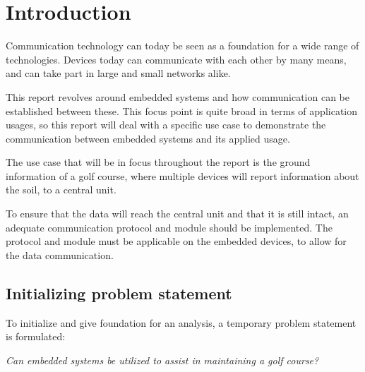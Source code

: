 \chapter{Introduction} 
Communication technology can today be seen as a foundation for a wide range of technologies. Devices today can communicate with each other by many means, and can take part in large and small networks alike.

This report revolves around embedded systems and how communication can be established between these. This focus point is quite broad in terms of application usages, so this report will deal with a specific use case to demonstrate the communication between embedded systems and its applied usage.

The use case that will be in focus throughout the report is the ground information of a golf course, where multiple devices will report information about the soil, to a central unit.


To ensure that the data will reach the central unit and that it is still intact, an adequate communication protocol and module should be implemented. The protocol and module must be applicable on the embedded devices, to allow for the data communication. 

\section*{Initializing problem statement}
To initialize and give foundation for an analysis, a temporary problem statement is formulated:

\textit{Can embedded systems be utilized to assist in maintaining a golf course?}


